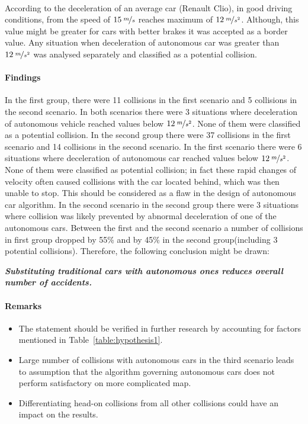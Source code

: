 \documentclass[11pt,english,twoside]{article}
\begin{document}
According to \citet{vangi2007evaluation} the deceleration of an average car (Renault Clio\textsuperscript{\textregistered}), in good driving conditions, from the speed of $15\:\nicefrac{m}{s}$ reaches maximum of $12\:\nicefrac{m}{s^2}$. Although, this value might be greater for cars with better brakes it was accepted as a border value. Any situation when deceleration of autonomous car was greater than $12\:\nicefrac{m}{s^2}$ was analysed separately and classified as a potential collision. 



\paragraph{Findings}

In the first group, there were 11 collisions in the first scenario and 5 collisions in the second scenario. In both scenarios there were 3 situations where deceleration of autonomous vehicle reached values below $12\:\nicefrac{m}{s^2}$. None of them were classified as a potential collision. 
In the second group there were 37 collisions in the first scenario and 14 collisions in the second scenario. In the first scenario there were 6 situations where deceleration of autonomous car reached values below $12\:\nicefrac{m}{s^2}$. None of them were classified as potential collision; in fact these rapid changes of velocity often caused collisions with the car located behind, which was then unable to stop. This should be considered as a flaw in the design of autonomous car algorithm. In the second scenario in the second group there were 3 situations where collision was likely prevented by abnormal deceleration of one of the autonomous cars. Between the first and the second scenario a number of collisions in first group dropped by 55\% and by 45\% in the second group(including 3 potential collisions). Therefore, the following conclusion might be drawn:

\textbf{\textit{Substituting traditional cars with autonomous ones reduces overall number of accidents.}}



\paragraph{Remarks}

\begin{itemize}
  \item The statement should be verified in further research by accounting for factors mentioned in Table~\ref{table:hypothesis1}.
  \item Large number of collisions with autonomous cars in the third scenario leads to assumption that the algorithm governing autonomous cars does not perform satisfactory on more complicated map. 
  \item Differentiating head-on collisions from all other collisions could have an impact on the results.
\end{itemize}
\end{document}
